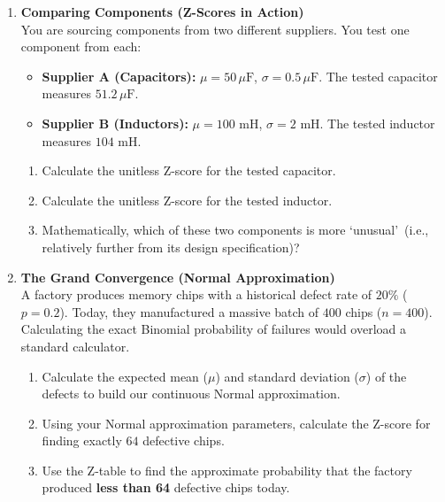 \begin{enumerate}[label=\textbf{Q\arabic*.}, leftmargin=*, start=4]
    \item \textbf{Comparing Components (Z-Scores in Action)} \\
    You are sourcing components from two different suppliers. You test one component from each:
    \begin{itemize}
        \item \textbf{Supplier A (Capacitors):} $\mu = 50\,\mu\text{F}$, $\sigma = 0.5\,\mu\text{F}$. The tested capacitor measures $51.2\,\mu\text{F}$.
        \item \textbf{Supplier B (Inductors):} $\mu = 100\text{ mH}$, $\sigma = 2\text{ mH}$. The tested inductor measures $104\text{ mH}$.
    \end{itemize}
    \begin{enumerate}[label=\arabic*.]
        \item Calculate the unitless Z-score for the tested capacitor.
        \item Calculate the unitless Z-score for the tested inductor.
        \item Mathematically, which of these two components is more \lq unusual\rq\ (i.e., relatively further from its design specification)?
    \end{enumerate}
    \vspace{0.3cm}

    \item \textbf{The Grand Convergence (Normal Approximation)} \\
    A factory produces memory chips with a historical defect rate of $20\%$ ($p = 0.2$). Today, they manufactured a massive batch of $400$ chips ($n = 400$). Calculating the exact Binomial probability of failures would overload a standard calculator.
    \begin{enumerate}[label=\arabic*.]
        \item Calculate the expected mean ($\mu$) and standard deviation ($\sigma$) of the defects to build our continuous Normal approximation.
        \item Using your Normal approximation parameters, calculate the Z-score for finding exactly $64$ defective chips.
        \item Use the Z-table to find the approximate probability that the factory produced \textbf{less than 64} defective chips today.
    \end{enumerate}

\end{enumerate}

